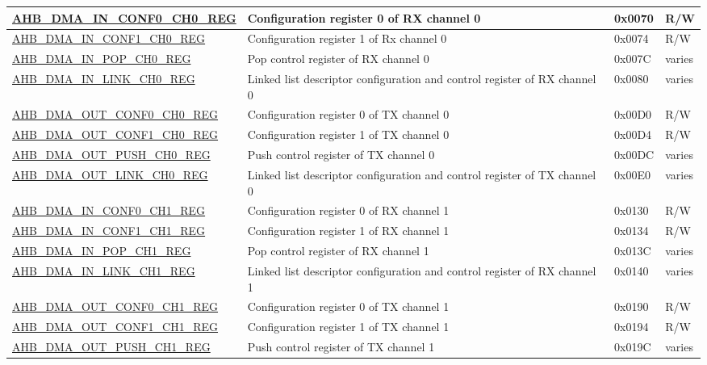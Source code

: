 \begin{longtable}{ | l | p{10cm} | p{1.3cm} | l | }
\hyperref[regdesc:AHBDMAINCONF0CHNREG]{AHB\_DMA\_IN\_CONF0\_CH0\_REG} & Configuration register 0 of RX channel 0 & 0x0070 & R/W \\ \hline
\hyperref[regdesc:AHBDMAINCONF1CHNREG]{AHB\_DMA\_IN\_CONF1\_CH0\_REG} & Configuration register 1 of Rx channel 0 & 0x0074 & R/W \\ \hline
\hyperref[regdesc:AHBDMAINPOPCHNREG]{AHB\_DMA\_IN\_POP\_CH0\_REG} & Pop control register of RX channel 0 & 0x007C & varies \\ \hline
\hyperref[regdesc:AHBDMAINLINKCHNREG]{AHB\_DMA\_IN\_LINK\_CH0\_REG} & Linked list descriptor configuration and control register of RX channel 0 & 0x0080 & varies \\ \hline
\hyperref[regdesc:AHBDMAOUTCONF0CHNREG]{AHB\_DMA\_OUT\_CONF0\_CH0\_REG} & Configuration register 0 of TX channel 0 & 0x00D0 & R/W \\ \hline
\hyperref[regdesc:AHBDMAOUTCONF1CHNREG]{AHB\_DMA\_OUT\_CONF1\_CH0\_REG} & Configuration register 1 of TX channel 0 & 0x00D4 & R/W \\ \hline
\hyperref[regdesc:AHBDMAOUTPUSHCHNREG]{AHB\_DMA\_OUT\_PUSH\_CH0\_REG} & Push control register of TX channel 0 & 0x00DC & varies \\ \hline
\hyperref[regdesc:AHBDMAOUTLINKCHNREG]{AHB\_DMA\_OUT\_LINK\_CH0\_REG} & Linked list descriptor configuration and control register of TX channel 0 & 0x00E0 & varies \\ \hline
\hyperref[regdesc:AHBDMAINCONF0CHNREG]{AHB\_DMA\_IN\_CONF0\_CH1\_REG} & Configuration register 0 of RX channel 1 & 0x0130 & R/W \\ \hline
\hyperref[regdesc:AHBDMAINCONF1CHNREG]{AHB\_DMA\_IN\_CONF1\_CH1\_REG} & Configuration register 1 of RX channel 1 & 0x0134 & R/W \\ \hline
\hyperref[regdesc:AHBDMAINPOPCHNREG]{AHB\_DMA\_IN\_POP\_CH1\_REG} & Pop control register of RX channel 1 & 0x013C & varies \\ \hline
\hyperref[regdesc:AHBDMAINLINKCHNREG]{AHB\_DMA\_IN\_LINK\_CH1\_REG} & Linked list descriptor configuration and control register of RX channel 1 & 0x0140 & varies \\ \hline
\hyperref[regdesc:AHBDMAOUTCONF0CHNREG]{AHB\_DMA\_OUT\_CONF0\_CH1\_REG} & Configuration register 0 of TX channel 1 & 0x0190 & R/W \\ \hline
\hyperref[regdesc:AHBDMAOUTCONF1CHNREG]{AHB\_DMA\_OUT\_CONF1\_CH1\_REG} & Configuration register 1 of TX channel 1 & 0x0194 & R/W \\ \hline
\hyperref[regdesc:AHBDMAOUTPUSHCHNREG]{AHB\_DMA\_OUT\_PUSH\_CH1\_REG} & Push control register of TX channel 1 & 0x019C & varies \\ \hline

\end{longtable}
